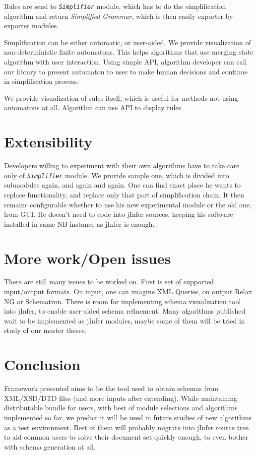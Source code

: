 \documentclass[a4paper,8pt,oneside,twocolumn]{article}
\newcommand{\jmodule}[1]{\texttt{\textit{#1}}}
\begin{document}
Rules are send to \jmodule{Simplifier} module, which has to do the simplification algorithm and return \emph{Simplified Grammar}, which is then easily exporter by exporter modules.

Simplification can be either automatic, or user-aided.
We provide visualization of non-deterministic finite automatons.
This helps algorithms that use merging state algorithm with user interaction.
Using simple API, algorithm developer can call our library to present automaton to user to make human decisions and continue in simplification process.

We provide visualization of rules itself, which is useful for methods not using automatons at all.
Algorithm can use API to display rules

\section*{Extensibility}
Developers willing to experiment with their own algorithms have to take care only of \jmodule{Simplifier} module.
We provide sample one, which is divided into submodules again, and again and again.
One can find exact place he wants to replace functionality, and replace only that part of simplification chain.
It then remains configurable whether to use his new experimental module or the old one, from GUI.
He doesn't need to code into jInfer sources, keeping his software installed in same NB instance as jInfer is enough.

\section*{More work/Open issues}
There are still many issues to be worked on.
First is set of supported input/output formats.
On input, one can imagine XML Queries, on output Relax NG or Schematron. 
There is room for implementing schema visualization tool into jInfer, to enable user-aided schema refinement.
Many algorithms published wait to be implemented as jInfer modules, maybe some of them will be tried in study of our master theses.

\section*{Conclusion}
Framework presented aims to be the tool used to obtain schemas from XML/XSD/DTD files (and more inputs after extending).
While maintaining distributable bundle for users, with best of module selections and algorithms implemented so far, we predict it will be used in future studies of new algorithms as a test environment.
Best of them will probably migrate into jInfer source tree to aid common users to solve their document set quickly enough, to even bother with schema generation at all.
\end{document}
